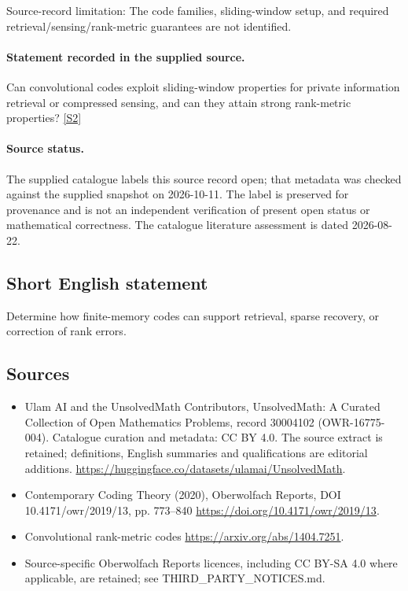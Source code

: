 \documentclass[11pt]{article}
\begin{document}
Source-record limitation: The code families, sliding-window setup, and required retrieval/sensing/rank-metric guarantees are not identified.
\paragraph{Statement recorded in the supplied source.}
Can convolutional codes exploit sliding-window properties for private information retrieval or compressed sensing, and can they attain strong rank-metric properties? \href{https://doi.org/10.4171/owr/2019/13}{[S2]}
\paragraph{Source status.}
The supplied catalogue labels this source record open; that metadata was checked against the supplied snapshot on 2026-10-11. The label is preserved for provenance and is not an independent verification of present open status or mathematical correctness. The catalogue literature assessment is dated 2026-08-22.
\subsection{Short English statement}
Determine how finite-memory codes can support retrieval, sparse recovery, or correction of rank errors.
\subsection{Sources}
\begin{itemize}
\item[S1] Ulam AI and the UnsolvedMath Contributors, UnsolvedMath: A Curated Collection of Open Mathematics Problems, record 30004102 (OWR-16775-004). Catalogue curation and metadata: CC BY 4.0. The source extract is retained; definitions, English summaries and qualifications are editorial additions.
\url{https://huggingface.co/datasets/ulamai/UnsolvedMath}.
\item[S2] Contemporary Coding Theory (2020), Oberwolfach Reports, DOI 10.4171/owr/2019/13, pp. 773--840
\url{https://doi.org/10.4171/owr/2019/13}.
\item[S3] Convolutional rank-metric codes
\url{https://arxiv.org/abs/1404.7251}.
\item Source-specific Oberwolfach Reports licences, including CC BY-SA 4.0 where applicable, are retained; see THIRD\_PARTY\_NOTICES.md.
\end{itemize}
\end{document}
